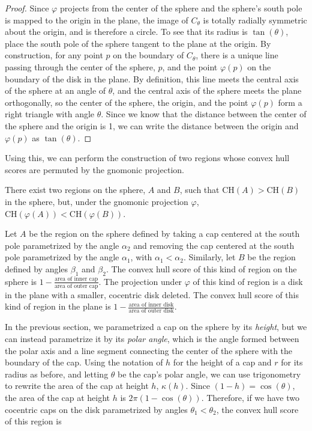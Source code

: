 {\begin{example}
\begin{proof}
    Since $\varphi$ projects from the center of the sphere and the
    sphere's south pole is mapped to the origin in the plane, the
    image of $C_\theta$ is totally radially symmetric about the
    origin, and is therefore a circle.  To see that its radius is
    $\tan(\theta)$, place the south pole of the sphere tangent to the
    plane at the origin. By construction, for any point $p$ on the
    boundary of $C_\theta$, there is a unique line passing through the
    center of the sphere, $p$, and the point $\varphi(p)$ on the
    boundary of the disk in the plane.  By definition, this line meets
    the central axis of the sphere at an angle of $\theta$, and the
    central axis of the sphere meets the plane orthogonally, so the
    center of the sphere, the origin, and the point $\varphi(p)$ form
    a right triangle with angle $\theta$.  Since we know that the
    distance between the center of the sphere and the origin is 1, we
    can write the distance between the origin and $\varphi(p)$ as
    $\tan(\theta)$.
  \end{proof}
  Using this, we can perform the construction of two regions whose
  convex hull scores are permuted by the gnomonic projection.

  \begin{lemma}
    There exist two regions on the sphere, $A$ and $B$, such that
    $\mathrm{CH}(A) > \mathrm{CH}(B)$ in the sphere, but, under the
    gnomonic projection $\varphi$,
    $\mathrm{CH}(\varphi(A))<\mathrm{CH}(\varphi(B))$.
  \end{lemma}

  Let $A$ be the region on the sphere defined by taking a cap centered
  at the south pole parametrized by the angle $\alpha_2$ and removing
  the cap centered at the south pole parametrized by the angle
  $\alpha_1$, with $\alpha_1<\alpha_2$.  Similarly, let $B$ be the
  region defined by angles $\beta_1$ and $\beta_2$.  The convex hull
  score of this kind of region on the sphere is $1-\frac{\text{area of
  inner cap}}{\text{area of outer cap}}$.  The projection under
  $\varphi$ of this kind of region is a disk in the plane with
  a smaller, cocentric disk deleted.  The convex hull score of this kind
  of region in the plane is $1-\frac{\text{area of inner
  disk}}{\text{area of outer disk}}$.  

  In the previous section, we parametrized a cap on the sphere by its
  \textit{height}, but we can instead parametrize it by its
  \textit{polar angle}, which is the angle formed between the polar axis
  and a line segment connecting the center of the sphere with the
  boundary of the cap.  Using the notation of $h$ for the height of
  a cap and $r$ for its radius as before, and letting $\theta$ be the
  cap's polar angle, we can use trigonometry to rewrite the area of the
  cap at height $h$, $\kappa(h)$.  Since $(1-h)=\cos(\theta)$, the area
  of the cap at height $h$ is $2\pi (1-\cos(\theta))$.  Therefore, if we
  have two cocentric caps on the disk parametrized by angles
  $\theta_1<\theta_2$, the convex hull score of this region is 


\end{example}}
